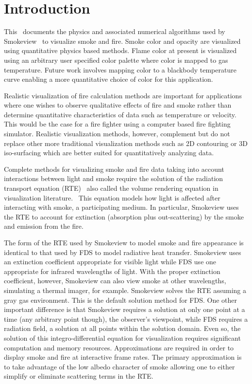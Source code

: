 


\section{Introduction}
This \paper\ documents the physics and associated numerical
algorithms used by Smokeview~\cite{Smokeview_Users_Guide} to
visualize smoke and fire.  Smoke color and opacity are visualized
using quantitative physics based methods.  Flame color at present
is visualized using an arbitrary user specified color palette
where color is mapped to gas temperature. Future work involves
mapping color to a blackbody temperature curve enabling a more
quantitative choice of color for this application.

Realistic visualization of fire calculation methods are important
for applications where one wishes to observe qualitative effects
of fire and smoke rather than determine quantitative
characteristics of data such as temperature or velocity.  This
would be the case for a fire fighter using a computer based fire
fighting simulator. Realistic visualization methods, however,
complement but do not replace other more traditional visualization
methods such as 2D contouring or 3D iso-surfacing which are better
suited for quantitatively analyzing data.

Complete methods for visualizing smoke and fire data taking into
account interactions between light and smoke require the solution
of the radiation transport equation (RTE)~\cite{Howell:2021} also
called the volume rendering equation in visualization
literature.~\cite{levoy:1988} This equation models how light is
affected after interacting with smoke, a participating medium. In
particular, Smokeview uses the RTE to account for extinction
(absorption plus out-scattering) by the smoke and emission from
the fire.

The form of the RTE used by Smokeview to model smoke and fire
appearance is identical to that used by FDS to model radiative
heat transfer. Smokeview uses an extinction coefficient
appropriate for visible light while FDS use one appropriate for
infrared wavelengths of light.  With the proper extinction
coefficient, however, Smokeview can also view smoke at other
wavelengths, simulating a thermal imager, for example. Smokeview
solves the RTE assuming a gray gas environment. This is the
default solution method for FDS. One other important difference is
that Smokeview requires a solution at only one point at a time
(any arbitrary point though), the observer's viewpoint, while FDS
requires a radiation field, a solution at all points within the
solution domain.  Even so, the solution of this
integro-differential equation for visualization requires
significant computation and memory  resources. Approximations are
required in order to display smoke and fire at interactive frame
rates.  The primary approximation is to take advantage of the low
albedo character of smoke allowing one to either simplify or
eliminate scattering terms in the RTE.

